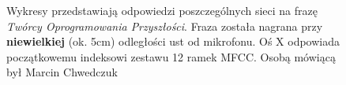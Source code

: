 \documentclass[a4paper]{article}
\begin{document}
\begin{figure}[h]
  		\caption{Wykresy przedstawiają odpowiedzi poszczególnych sieci na 
  		frazę \textit{Twórcy Oprogramowania Przyszłości}. Fraza została nagrana przy \textbf{niewielkiej} (ok. 5cm)
  		odległości ust od mikrofonu. Oś X odpowiada początkowemu indeksowi zestawu 12 ramek MFCC. Osobą
  		mówiącą był Marcin Chwedczuk}
  		\label{fig:netansblisko}
	\end{figure}	
	
\end{document}
